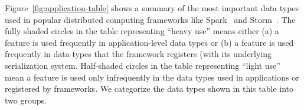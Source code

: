 \documentclass[preprint,10pt]{sigplanconf}
\theoremstyle{definition}
\theoremstyle{definition}
\begin{document}

Figure~\ref{fig:application-table} shows a summary of the most
important data types used in popular distributed computing frameworks
like Spark~\cite{Zaharia2012} and Storm~\cite{Storm}.
The fully shaded circles in the table representing ``heavy use'' means either
(a) a feature is used frequently in application-level data types or
(b) a feature is used frequently in data types that the framework registers
(with its underlying serialization system.
Half-shaded circles in the table representing ``light use'' mean a feature is used
only infrequently in the data types used in applications or registered by
frameworks. We categorize the data types shown in this table into two groups.
\end{document}
